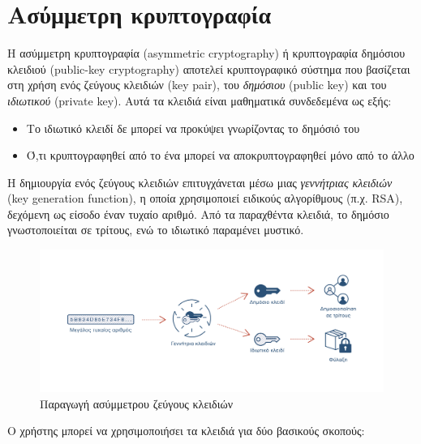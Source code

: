\section{Ασύμμετρη κρυπτογραφία} \label{section:2-2-asymmetric-cryptography}

Η ασύμμετρη κρυπτογραφία (asymmetric cryptography) ή κρυπτογραφία δημόσιου κλειδιού (public-key cryptography) αποτελεί κρυπτογραφικό σύστημα που βασίζεται στη χρήση ενός ζεύγους κλειδιών (key pair), του \textit{δημόσιου} (public key) και του \textit{ιδιωτικού} (private key). Αυτά τα κλειδιά είναι μαθηματικά συνδεδεμένα ως εξής:

\begin{itemize}
	\item Το ιδιωτικό κλειδί δε μπορεί να προκύψει γνωρίζοντας το δημόσιό του
	\item Ό,τι κρυπτογραφηθεί από το ένα μπορεί να αποκρυπτογραφηθεί μόνο από το άλλο 
\end{itemize}
	
Η δημιουργία ενός ζεύγους κλειδιών επιτυγχάνεται μέσω μιας \textit{γεννήτριας κλειδιών} (\textenglish{key generation function}), η οποία χρησιμοποιεί ειδικούς αλγορίθμους (π.χ. RSA), δεχόμενη ως είσοδο έναν τυχαίο αριθμό. Από τα παραχθέντα κλειδιά, το δημόσιο γνωστοποιείται σε τρίτους, ενώ το ιδιωτικό παραμένει μυστικό.

\begin{figure}[H]
	\centering
	\includegraphics[width=15cm]{assets/figures/asymmetric-key-generation.png}
	\caption{Παραγωγή ασύμμετρου ζεύγους κλειδιών}
\end{figure}

Ο χρήστης μπορεί να χρησιμοποιήσει τα κλειδιά για δύο βασικούς σκοπούς:

